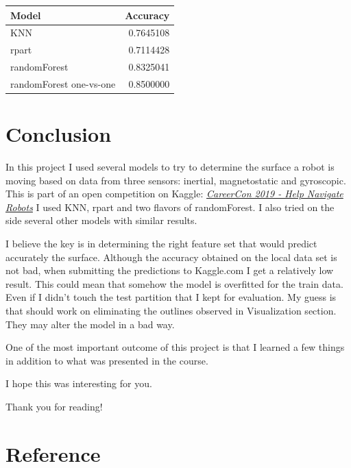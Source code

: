 \documentclass[]{article}
\begin{document}
\begin{longtable}[]{@{}lr@{}}
\toprule
Model & Accuracy\tabularnewline
\midrule
\endhead
KNN & 0.7645108\tabularnewline
rpart & 0.7114428\tabularnewline
randomForest & 0.8325041\tabularnewline
randomForest one-vs-one & 0.8500000\tabularnewline
\bottomrule
\end{longtable}

\hypertarget{conclusion}{%
\section{Conclusion}\label{conclusion}}

In this project I used several models to try to determine the surface a
robot is moving based on data from three sensors: inertial,
magnetostatic and gyroscopic. This is part of an open competition on
Kaggle: \href{https://www.kaggle.com/c/career-con-2019}{\emph{CareerCon
2019 - Help Navigate Robots}} I used KNN, rpart and two flavors of
randomForest. I also tried on the side several other models with similar
results.

I believe the key is in determining the right feature set that would
predict accurately the surface. Although the accuracy obtained on the
local data set is not bad, when submitting the predictions to Kaggle.com
I get a relatively low result. This could mean that somehow the model is
overfitted for the train data. Even if I didn't touch the test partition
that I kept for evaluation. My guess is that should work on eliminating
the outlines observed in Visualization section. They may alter the model
in a bad way.

One of the most important outcome of this project is that I learned a
few things in addition to what was presented in the course.

I hope this was interesting for you.

Thank you for reading!

\hypertarget{reference}{%
\section{Reference}\label{reference}}
\end{document}
